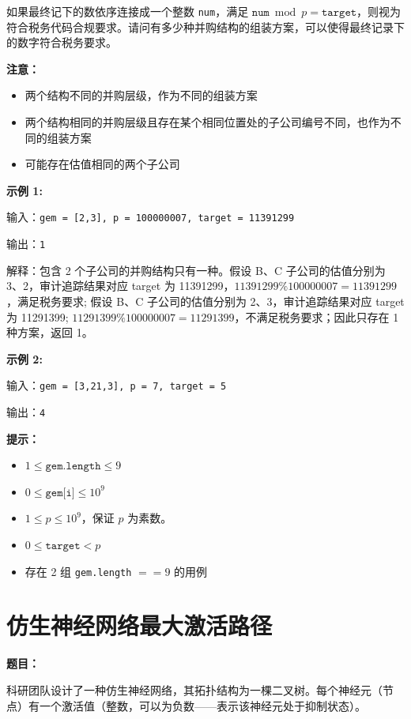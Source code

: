 \documentclass[12pt, a4paper]{article}
\begin{document}
如果最终记下的数依序连接成一个整数 \texttt{num}，满足 $\texttt{num} \bmod p = \texttt{target}$，则视为符合税务代码合规要求。请问有多少种并购结构的组装方案，可以使得最终记录下的数字符合税务要求。

\textbf{注意：}
\begin{itemize}[leftmargin=2em]
  \item 两个结构不同的并购层级，作为不同的组装方案
  \item 两个结构相同的并购层级且存在某个相同位置处的子公司编号不同，也作为不同的组装方案
  \item 可能存在估值相同的两个子公司
\end{itemize}

\textbf{示例 1:}

输入：\texttt{gem = [2,3], p = 100000007, target = 11391299}

输出：\texttt{1}

解释：包含 2 个子公司的并购结构只有一种。假设 B、C 子公司的估值分别为 3、2，审计追踪结果对应 target 为 11391299，$11391299 \% 100000007 = 11391299$，满足税务要求; 假设 B、C 子公司的估值分别为 2、3，审计追踪结果对应 target 为 11291399; $11291399 \% 100000007 = 11291399$，不满足税务要求；因此只存在 1 种方案，返回 1。

\textbf{示例 2:}

输入：\texttt{gem = [3,21,3], p = 7, target = 5}

输出：\texttt{4}

\textbf{提示：}
\begin{itemize}[leftmargin=2em]
  \item $1 \leq \texttt{gem.length} \leq 9$
  \item $0 \leq \texttt{gem[i]} \leq 10^9$
  \item $1 \leq p \leq 10^9$，保证 $p$ 为素数。
  \item $0 \leq \texttt{target} < p$
  \item 存在 2 组 \texttt{gem.length} $== 9$ 的用例
\end{itemize}



\section{仿生神经网络最大激活路径}

\noindent\textbf{题目：}

科研团队设计了一种仿生神经网络，其拓扑结构为一棵二叉树。每个神经元（节点）有一个激活值（整数，可以为负数——表示该神经元处于抑制状态）。
\end{document}
